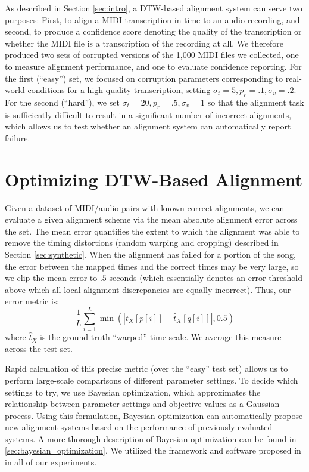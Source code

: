 As described in Section \ref{sec:intro}, a DTW-based alignment system can serve two purposes: First, to align a MIDI transcription in time to an audio recording, and second, to produce a confidence score denoting the quality of the transcription or whether the MIDI file is a transcription of the recording at all.
We therefore produced two sets of corrupted versions of the 1,000 MIDI files we collected, one to measure alignment performance, and one to evaluate confidence reporting.
For the first (``easy'') set, we focused on corruption parameters corresponding to real-world conditions for a high-quality transcription, setting $\sigma_t = 5, p_r = .1, \sigma_v = .2$.
For the second (``hard''), we set $\sigma_t = 20, p_r = .5, \sigma_v = 1$ so that the alignment task is sufficiently difficult to result in a significant number of incorrect alignments, which allows us to test whether an alignment system can automatically report failure.

\section{Optimizing DTW-Based Alignment}
\label{sec:optimizing}

Given a dataset of MIDI/audio pairs with known correct alignments, we can evaluate a given alignment scheme via the mean absolute alignment error across the set.
The mean error quantifies the extent to which the alignment was able to remove the timing distortions (random warping and cropping) described in Section \ref{sec:synthetic}.
When the alignment has failed for a portion of the song, the error between the mapped times and the correct times may be very large, so we clip the mean error to $.5$ seconds (which essentially denotes an error threshold above which all local alignment discrepancies are equally incorrect).  Thus, our error metric is:
$$
\frac{1}{L}\sum_{i = 1}^{L} \min(|t_X[p[i]] - \hat{t}_X[q[i]]|, 0.5)
$$
where $\hat{t}_X$ is the ground-truth ``warped'' time scale.  We average this measure across the test set.

Rapid calculation of this precise metric (over the ``easy'' test set) allows us to perform large-scale comparisons of different parameter settings.
To decide which settings to try, we use Bayesian optimization, which approximates the relationship between parameter settings and objective values as a Gaussian process.
Using this formulation, Bayesian optimization can automatically propose new alignment systems based on the performance of previously-evaluated systems.
A more thorough description of Bayesian optimization can be found in \ref{sec:bayesian_optimization}.
We utilized the framework and software proposed in \cite{snoek2012practical} in all of our experiments.

